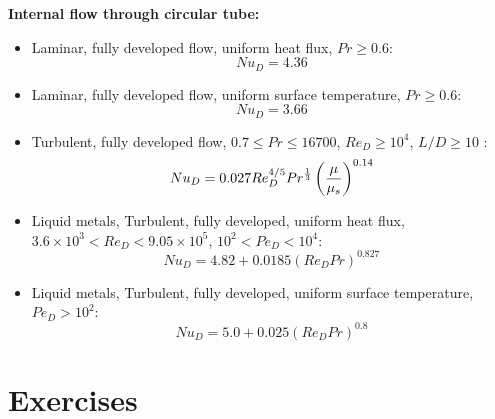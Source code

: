 {\bf Internal flow through circular tube:}\\
\begin{itemize}
 \item Laminar, fully developed flow, uniform heat flux, $Pr \ge 0.6$: $$Nu_D = 4.36 $$
 \item Laminar, fully developed flow, uniform surface temperature, $Pr \ge 0.6$: $$Nu_D = 3.66 $$
 \item Turbulent, fully developed flow, $0.7 \le Pr \le 16700$, $Re_D \ge 10^4$, ${L/D} \ge 10$ :
       $$ Nu_D = 0.027 Re_D^{4 / 5} Pr^{1 \over 3} \left( \mu \over \mu_s \right)^{0.14} $$
 \item Liquid metals, Turbulent, fully developed, uniform heat flux, $3.6 \times 10^3 < Re_D < 9.05\times 10^5$, $10^2 < Pe_D < 10^4$: $$Nu_D = 4.82 + 0.0185 \left( Re_D Pr \right)^{0.827} $$
 \item Liquid metals, Turbulent, fully developed, uniform surface temperature, $Pe_D > 10^2$: $$ Nu_D = 5.0 + 0.025 \left( Re_D Pr \right)^{0.8} $$
\end{itemize}


\section{Exercises}

